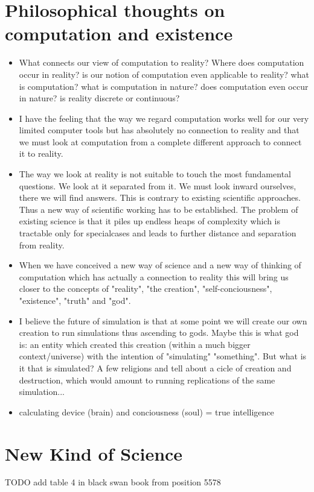 \documentclass{article}
\begin{document}
\section{Philosophical thoughts on computation and existence}
\begin{itemize}
\item What connects our view of computation to reality? Where does computation occur in reality? is our notion of computation even applicable to reality? what is computation? what is computation in nature? does computation even occur in nature? is reality discrete or continuous?
\item I have the feeling that the way we regard computation works well for our very limited computer tools but has absolutely no connection to reality and that we must look at computation from a complete different approach to connect it to reality.
\item The way we look at reality is not suitable to touch the most fundamental questions. We look at it separated from it. We must look inward ourselves, there we will find answers. This is contrary to existing scientific approaches. Thus a new way of scientific working has to be established. The problem of existing science is that it piles up endless heaps of complexity which is tractable only for specialcases and leads to further distance and separation from reality.
\item When we have conceived a new way of science and a new way of thinking of computation which has actually a connection to reality this will bring us closer to the concepts of "reality", "the creation", "self-conciousness", "existence", "truth" and "god".
\item I believe the future of simulation is that at some point we will create our own creation to run simulations thus ascending to gods. Maybe this is what god is: an entity which created this creation (within a much bigger context/universe) with the intention of "simulating" "something". But what is it that is simulated? A few religions and tell about a cicle of creation and destruction, which would amount to running replications of the same simulation... 
\item calculating device (brain) and conciousness (soul) = true intelligence
\end{itemize}

\section{New Kind of Science}
TODO add table 4 in black swan book from position 5578
\end{document}
